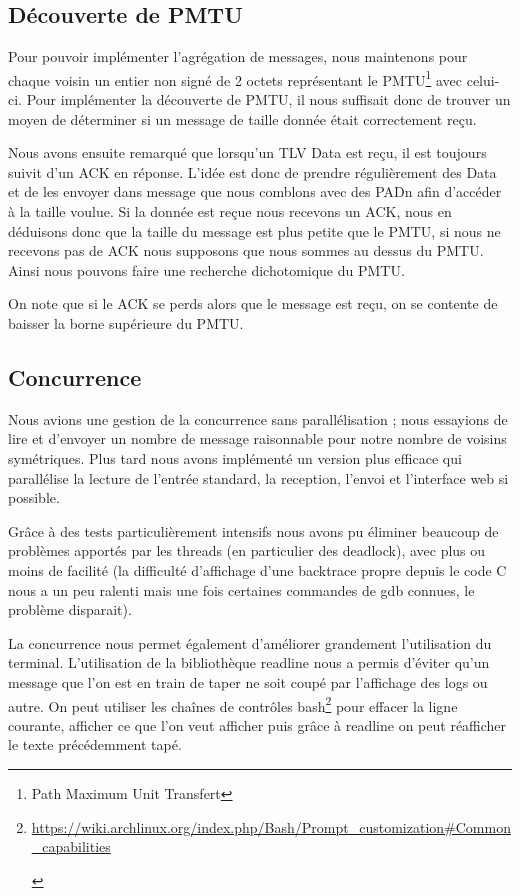 \documentclass[a4paper,10pt]{article} %
\let\urlorig\url
\renewcommand{\url}[1]{\begin{otherlanguage}{english}\urlorig{#1}\end{otherlanguage}}
\begin{document}
\subsection{Découverte de PMTU\label{sec:pmtu}}

Pour pouvoir implémenter l'agrégation de messages, nous maintenons pour chaque voisin un entier non signé de 2 octets représentant le \textrm{PMTU}\footnote{Path Maximum Unit Transfert} avec celui-ci. Pour implémenter la découverte de \textrm{PMTU}, il nous suffisait donc de trouver un moyen de déterminer si un message de taille donnée était correctement reçu.

Nous avons ensuite remarqué que lorsqu'un TLV Data est reçu, il est toujours suivit d'un ACK en réponse. L'idée est donc de prendre régulièrement des Data et de les envoyer dans message que nous comblons avec des PADn afin d’accéder à la taille voulue. Si la donnée est reçue nous recevons un ACK, nous en déduisons donc que la taille du message est plus petite que le \textrm{PMTU}, si nous ne recevons pas de ACK nous supposons que nous sommes au dessus du \textrm{PMTU}. Ainsi nous pouvons faire une recherche dichotomique du PMTU.

On note que si le ACK se perds alors que le message est reçu, on se contente de baisser la borne supérieure du PMTU.

\subsection{Concurrence\label{sec:con}}
Nous avions une gestion de la concurrence sans parallélisation ; nous essayions de lire et d'envoyer un nombre de message raisonnable pour notre nombre de voisins symétriques. Plus tard nous avons implémenté un version plus efficace qui parallélise la lecture de l'entrée standard, la reception, l'envoi et l'interface web si possible.

Grâce à des tests particulièrement intensifs nous avons pu éliminer beaucoup de problèmes apportés par les threads (en particulier des deadlock), avec plus ou moins de facilité (la difficulté d'affichage d'une backtrace propre depuis le code C nous a un peu ralenti mais une fois certaines commandes de gdb connues, le problème disparait).

La concurrence nous permet également d'améliorer grandement l'utilisation du terminal. L'utilisation de la bibliothèque readline nous a permis d'éviter qu'un message que l'on est en train de taper ne soit coupé par l'affichage des logs ou autre. On peut utiliser les chaînes de contrôles bash\footnote{\url{https://wiki.archlinux.org/index.php/Bash/Prompt\_customization\#Common\_capabilities}} pour effacer la ligne courante, afficher ce que l'on veut afficher puis grâce à readline on peut réafficher le texte précédemment tapé.
\end{document}
